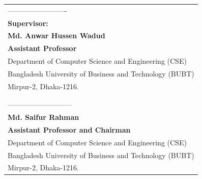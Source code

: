 \documentclass[12pt]{ucthesis}
\begin{document}
\begin{frontmatter}
\begin{tabular}{l}
\hspace{-0.8cm}------------------------- \\
\hspace{-0.8cm}\textbf{Supervisor:}\\
\hspace{-0.8cm}\textbf{Md. Anwar Hussen Wadud}\\
\hspace{-0.8cm}\textbf {Assistant Professor}\\
\hspace{-0.82cm}Department of Computer Science and Engineering (CSE)\\
\hspace{-0.82cm}Bangladesh University of Business and Technology (BUBT)\\
\hspace{-0.82cm}Mirpur-2, Dhaka-1216.\\
\\
\\
\hspace{-0.8cm}--------------------------- \\
\hspace{-0.8cm}\textbf {Md. Saifur Rahman}\\
\hspace{-0.8cm}\textbf{Assistant Professor and Chairman}\\
\hspace{-0.82cm}Department of Computer Science and Engineering (CSE)\\
\hspace{-0.82cm}Bangladesh University of Business and Technology (BUBT)\\
\hspace{-0.82cm}Mirpur-2, Dhaka-1216.\\

       
        \end{tabular}

 
    
   
 
   

\end{frontmatter}
\end{document}
